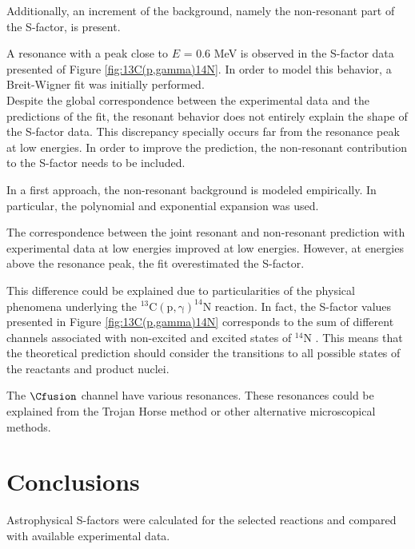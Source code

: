 \documentclass[openany]{book}
\begin{document}
Additionally, an increment of the background, namely the non-resonant part of the S-factor, is present.



A resonance with a peak close to $E$ = 0.6 MeV is observed in the S-factor data presented of Figure \ref{fig:13C(p,gamma)14N}. In order to model this behavior, a Breit-Wigner fit was initially performed.  \\


Despite the global correspondence between the experimental data and the predictions of the fit, the resonant behavior does not entirely explain the shape of the S-factor data. This discrepancy specially  occurs far from the resonance peak at low energies. In order to improve the prediction, the non-resonant contribution to the S-factor needs to be included. 

In a first approach, the non-resonant background is modeled empirically. In particular, the polynomial and exponential expansion was used.

The correspondence between the joint resonant and non-resonant prediction with experimental data at low energies improved at low energies. However, at energies above the resonance peak, the fit overestimated the S-factor. 

This difference could be explained due to particularities of the physical phenomena underlying the $\mathrm{{}^{13}C(p, \gamma)^{14}N}$ reaction. In fact, the S-factor values presented in Figure \ref{fig:13C(p,gamma)14N} corresponds to the sum of different channels associated with non-excited and excited states of  $\mathrm{{}^{14}N}$ \cite{xu_takahashi_goriely_arnould_ohta_utsunomiya_2013}. This means that the theoretical prediction should consider the transitions to all possible states of the reactants and product nuclei.



The $\Cfusion$ channel have various resonances. These resonances could be explained from the Trojan Horse method or other alternative microscopical methods.


\chapter{Conclusions} \label{ch:conclusions}

Astrophysical S-factors were calculated for the selected reactions and compared with available experimental data.  \\
\end{document}

